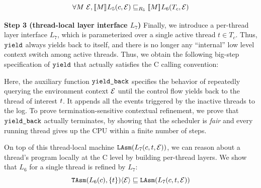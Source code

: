 {{\begin{lemma}
{\small
\[
\forall M~ \oracle, 
\sem{ }{M}L_5(c,\oracle) \Refrel_{R_5} 
\sem{}{M}L_6(T_c, \oracle)
\]}
\label{whole_thread_composition}
\end{lemma}}


\noindent\textbf{Step 3 (thread-local layer interface $L_7$)} 
Finally, we introduce a per-thread layer interface $L_7$, which is parameterized
over a single active thread $t\in T_c$.
Thus, $\yield$ always yields back to itself,
and there is no longer any ``internal'' low level context switch among active threads.
Thus, we obtain the following big-step specification of $\yield$ that actually
satisfies the C calling convention:
\begin{small}
\begin{mathpar}
\end{mathpar}
\end{small}%
Here, the auxiliary function $\comm{yield\_back}$ 
specifies the behavior of repeatedly querying the environment context
$\oracle$ until the control flow yields back to the thread of interest $\tid$.
It appends all the events triggered by the inactive threads to the log.
To prove termination-sensitive contextual refinement,
we prove that $\comm{yield\_back}$ actually terminates,
by showing that the scheduler is \emph{fair} and every running
thread gives up the CPU within a finite number of steps.

On top of this thread-local machine $\LAsm(L_7(c, t, \oracle))$,
we can reason about a thread's program 
locally at the C level by building per-thread layers.
We show that $L_6$ for a single thread is refined by $L_7$:
{\small
\[ \TAsm(L_6(c), \{t\})\langle \oracle \rangle \Refrel \LAsm(L_7(c, t, \oracle)) \]
}%

}
